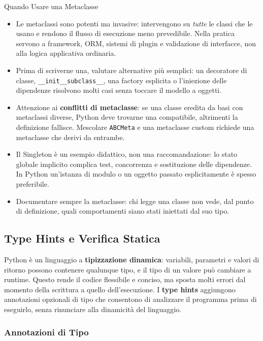 \documentclass[12pt]{extarticle}
\begin{document}
\begin{cbox}{Quando Usare una Metaclasse}
\begin{itemize}
    \item Le metaclassi sono potenti ma invasive: intervengono su \emph{tutte} le classi che le usano e rendono il flusso di esecuzione meno prevedibile. Nella pratica servono a framework, ORM, sistemi di plugin e validazione di interfacce, non alla logica applicativa ordinaria.
    \item Prima di scriverne una, valutare alternative più semplici: un decoratore di classe, \texttt{\_\_init\_\_subclass\_\_}, una factory esplicita o l'iniezione delle dipendenze risolvono molti casi senza toccare il modello a oggetti.
    \item Attenzione ai \textbf{conflitti di metaclasse}: se una classe eredita da basi con metaclassi diverse, Python deve trovarne una compatibile, altrimenti la definizione fallisce. Mescolare \texttt{ABCMeta} e una metaclasse custom richiede una metaclasse che derivi da entrambe.
    \item Il Singleton è un esempio didattico, non una raccomandazione: lo stato globale implicito complica test, concorrenza e sostituzione delle dipendenze. In Python un'istanza di modulo o un oggetto passato esplicitamente è spesso preferibile.
    \item Documentare sempre la metaclasse: chi legge una classe non vede, dal punto di definizione, quali comportamenti siano stati iniettati dal suo tipo.
\end{itemize}
\end{cbox}

\subsection{Type Hints e Verifica Statica}

\noindent Python è un linguaggio a \textbf{tipizzazione dinamica}: variabili, parametri e valori di ritorno possono contenere qualunque tipo, e il tipo di un valore può cambiare a runtime. Questo rende il codice flessibile e conciso, ma sposta molti errori dal momento della scrittura a quello dell'esecuzione. I \textbf{type hints} aggiungono annotazioni opzionali di tipo che consentono di analizzare il programma prima di eseguirlo, senza rinunciare alla dinamicità del linguaggio.

\subsubsection{Annotazioni di Tipo}
\end{document}
